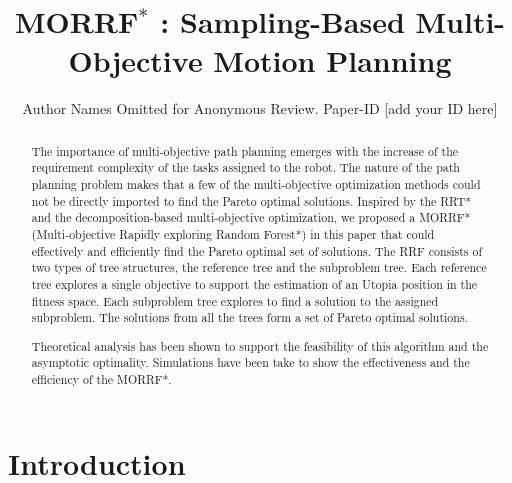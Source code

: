 \documentclass[conference]{IEEEtran}
\begin{document}
\title{ MORRF$^{*}$ : Sampling-Based Multi-Objective Motion Planning }

\author{Author Names Omitted for Anonymous Review. Paper-ID [add your ID here]}

\maketitle

\begin{abstract}
The importance of multi-objective path planning emerges with the increase of the requirement complexity of the tasks assigned to the robot.
The nature of the path planning problem makes that a few of the multi-objective optimization methods could not be directly imported to find the Pareto optimal solutions.
Inspired by the RRT* and the decomposition-based multi-objective optimization, we proposed a MORRF*(Multi-objective Rapidly exploring Random Forest*) in this paper that could effectively and efficiently find the Pareto optimal set of solutions.
The RRF consists of two types of tree structures, the reference tree and the subproblem tree.
Each reference tree explores a single objective to support the estimation of an Utopia position in the fitness space.
Each subproblem tree explores to find a solution to the assigned subproblem.
The solutions from all the trees form a set of Pareto optimal solutions. 

Theoretical analysis has been shown to support the feasibility of this algorithm and the asymptotic optimality. 
Simulations have been take to show the effectiveness and the efficiency of the MORRF*.
\end{abstract}

\IEEEpeerreviewmaketitle

\section{Introduction}
\label{sec:intro}
\end{document}
